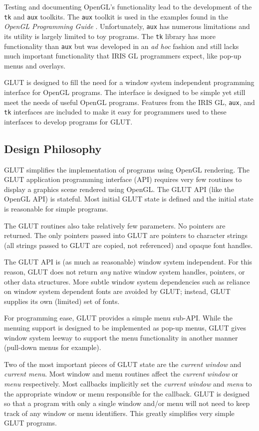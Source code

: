 \documentclass[titlepage,twoside]{article}
\begin{document}
Testing and documenting OpenGL's functionality lead to the development
of the {\tt tk} and {\tt aux} toolkits.  The {\tt aux} toolkit is used
in the examples found in the {\em OpenGL Programming Guide}
\cite{neider93}.  Unfortunately, {\tt aux} has numerous limitations and
its utility is largely limited to toy programs.  The {\tt tk} library
has more functionality than {\tt aux} but was developed in an {\em ad
hoc} fashion and still lacks much important functionality that IRIS GL
programmers expect, like pop-up menus and overlays.

GLUT is designed to fill the need for a window system independent
programming interface for OpenGL programs.  The interface is designed
to be simple yet still meet the needs of useful OpenGL programs.
Features from the IRIS GL, {\tt aux}, and {\tt tk} interfaces are
included to make it easy for programmers used to these interfaces
to develop programs for GLUT.

\subsection{Design Philosophy}

GLUT simplifies the implementation of programs using OpenGL rendering.
The GLUT application programming interface (API) requires very few
routines to display a graphics scene rendered using OpenGL.  The GLUT
API (like the OpenGL API) is stateful.  Most initial GLUT state is
defined and the initial state is reasonable for simple programs.

The GLUT routines also take relatively few parameters.  No pointers are
returned.  The only pointers passed into GLUT are pointers to character
strings (all strings passed to GLUT are copied, not referenced) and
opaque font handles.

The GLUT API is (as much as reasonable) window system independent.  For
this reason, GLUT does not return {\em any} native window system
handles, pointers, or other data structures.  More subtle window system
dependencies such as reliance on window system dependent fonts are
avoided by GLUT; instead, GLUT supplies its own (limited) set of
fonts.

For programming ease, GLUT provides a simple menu sub-API.  While the
menuing support is designed to be implemented as pop-up menus, GLUT
gives window system leeway to support the menu functionality in
another manner (pull-down menus for example).

Two of the most important pieces of GLUT state are the {\em current
window} and {\em current menu}.  Most window and menu routines affect
the {\em current window} or {\em menu} respectively.  Most callbacks
implicitly set the {\em current window} and {\em menu} to the
appropriate window or menu responsible for the callback.  GLUT is
designed so that a program with only a single window and/or menu will
not need to keep track of any window or menu identifiers.  This greatly
simplifies very simple GLUT programs.
\end{document}
